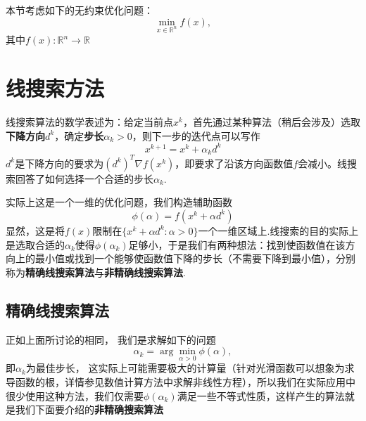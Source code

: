 本节考虑如下的无约束优化问题：
\begin{equation}\label{ucp}
	\min\limits_{x\in\mathbb{R}^n} f(x),
\end{equation}
其中$f(x): \mathbb{R}^n\to\mathbb{R}$
\section{线搜索方法}
线搜索算法的数学表述为：给定当前点$x^k$，首先通过某种算法（稍后会涉及）选取\textbf{下降方向}$d^k$，确定\textbf{步长}$\alpha_k>0$，则下一步的迭代点可以写作
\begin{equation}\label{iter}
	x^{k+1} = x^k + \alpha_k d^k
\end{equation}
$d^k$是下降方向的要求为$(d^k)^T\nabla f(x^k)$，即要求了沿该方向函数值$f$会减小。线搜索回答了如何选择一个合适的步长$\alpha_k$.\par
实际上这是一个一维的优化问题，我们构造辅助函数
\begin{equation*}
	\phi(\alpha) = f(x^k+\alpha d^k)
\end{equation*}
显然，这是将$f(x)$限制在$\{x^k+\alpha d^k: \alpha > 0\}$一个一维区域上.线搜索的目的实际上是选取合适的$\alpha_k$使得$\phi(\alpha_k)$足够小，于是我们有两种想法：找到使函数值在该方向上的最小值或找到一个能够使函数值下降的步长（不需要下降到最小值），分别称为\textbf{精确线搜索算法}与\textbf{非精确线搜索算法}.
\subsection{精确线搜索算法}
正如上面所讨论的相同， 我们是求解如下的问题
\begin{equation*}
	\alpha_k = \arg \min\limits_{\alpha>0} \phi(\alpha),
\end{equation*}
即$\alpha_k$为最佳步长， 这实际上可能需要极大的计算量（针对光滑函数可以想象为求导函数的根，详情参见数值计算方法中求解非线性方程），所以我们在实际应用中很少使用这种方法，我们仅需要$\phi(\alpha_k)$满足一些不等式性质，这样产生的算法就是我们下面要介绍的\textbf{非精确搜索算法}
